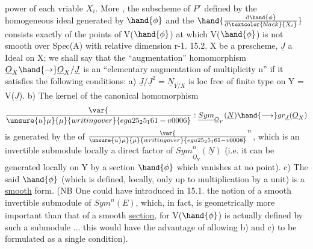 
power of each vriable $X_i$. More , the subscheme
of $P^r$ defined by the homogeneous ideal generated by  $\hand{\phi}$ and the $\hand{\frac{\partial\hand{\phi}}{\partial\textcolor{black}{X_i}}}$ consists
exactly of the points of V($\hand{\phi}$) at which V($\hand{\phi}$) is not smooth over
Spec(A) with relative dimension r-1.
15.2.  X be a prescheme, $\underline{J}$ a  Ideal  on X; we shall say that
the ``augmentation'' homomorphism $\underline{O}_X \hand{\to} \underline{O}_X/\underline{J}$ is an ``elementary
augmentation of multiplicity n'' if it satisfies the following conditions:
a) $\underline{J}/\underline{J}^2 = \underline{N}_{Y/X}$ is loc free of finite type on Y = V($\underline{J}$).
b) The kernel of the canonical homomorphism
\[ \var{\over{\unsure{u}}{\mu}}{\mu}{writing over}{ega25_25_161-v0006} : \underline{Sym}_{\underline{O}_Y}(\underline{N}) \hand{\longrightarrow} gr_{\underline{J}}(\underline{O}_X) \]
is generated by the   of $\var{\over{\unsure{u}}{\mu}}{\mu}{writing over}{ega25_25_161-v0008}^n$, which is an invertible submodule
locally a direct factor of $\underline{Sym}^n_{\underline{O}_Y}(\underline{N})$ (i.e. it can be generated locally
on Y by a section $\hand{\phi}$ which  vanishes at no point).
c) The said $\hand{\phi}$ (which is defined, locally, only up to multiplication
by a unit) is a \uline{smooth} form. (NB One could have introduced in
15.1. the notion of a smooth invertible submodule of $\underline{Sym}^n(E)$, which, in fact,
is geometrically more important than that of a smooth \uline{section}, for V($\hand{\phi}$) is
actually defined by such a submodule ... this would have the advantage of
allowing b) and c) to be formulated as a single condition).

